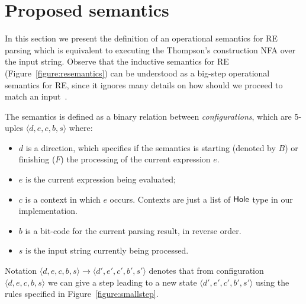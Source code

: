 \documentclass[sigplan]{acmart}
\theoremstyle{definition}
\newcommand{\D}[1]{\blue{\mathsf{#1}}}
\newcommand{\conf}[1]{\ensuremath{\langle #1 \rangle}}
\begin{document}
\section{Proposed semantics}\label{section:semantics}


In this section we present the definition of an operational semantics for RE parsing which is
equivalent to executing the Thompson's construction NFA over the input string. Observe that
the inductive semantics for RE (Figure~\ref{figure:resemantics}) can be understood as a big-step
operational semantics for RE, since it ignores many details on how should we proceed to match
an input~\cite{Rathnayake2011}.

The semantics is defined as a binary relation between \emph{configurations}, which are 5-uples
$\conf{d,e,c,b,s}$ where:
\begin{itemize}
  \item $d$ is a direction, which specifies if the semantics is starting (denoted by $B$) or
        finishing ($F$) the processing of the current expression $e$.
  \item $e$ is the current expression being evaluated;
  \item $c$ is a context in which $e$ occurs. Contexts are just a list of
        \ensuremath{\D{Hole}} type in our implementation.
  \item $b$ is a bit-code for the current parsing result, in reverse order.
  \item $s$ is the input string currently being processed.
\end{itemize}
Notation $\conf{d,e,c,b,s}\to\conf{d',e',c',b',s'}$ denotes that from
configuration $\conf{d,e,c,b,s}$ we can give a step leading to a new state
$\conf{d',e',c',b',s'}$ using the rules specified in Figure~\ref{figure:smallstep}.
\end{document}
